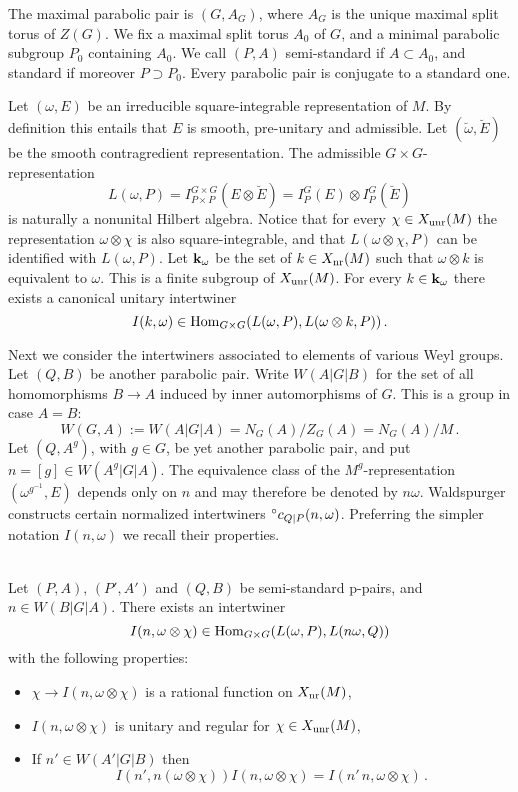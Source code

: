 The maximal parabolic pair is $(G,A_G )$, where $A_G$ is the unique
maximal split torus of $Z(G)$.
We fix a maximal split torus $A_0$ of $G$, and a minimal parabolic
subgroup $P_0$ containing $A_0$. We call $(P,A)$ semi-standard if
$A \subset A_0$, and standard if moreover $P \supset P_0$. Every
parabolic pair is conjugate to a standard one.

Let $(\omega ,E)$ be an irreducible square-integrable representation of $M$. 
By definition this entails that $E$ is smooth, pre-unitary and admissible. 
Let $(\breve \omega, \breve E)$ be the smooth contragredient representation. 
The admissible $G\times G$-representation
\[
L(\omega ,P) = I_{P \times P}^{G \times G} (E \otimes \breve E) =
I_P^G (E) \otimes I_P^G (\breve E )
\]
is naturally a nonunital Hilbert algebra. Notice that for every
$\chi \in X_{\mathrm{unr}} (M)$ the representation $\omega \otimes \chi$ is
also square-integrable, and that $L(\omega \otimes \chi ,P)$ can
be identified with $L(\omega ,P)$. Let $\mathbf k_\omega$ be the set of $k
\in X_{\mathrm{nr}} (M)$ such that $\omega \otimes k$ is equivalent to
$\omega$. This is a finite subgroup of $X_{\mathrm{unr}} (M)$. For every $k
\in \mathbf k_\omega$ there exists a canonical unitary intertwiner
\[
I(k,\omega ) \in \mathrm{Hom}_{G \times G} (L (\omega ,P),L(\omega \otimes k,P)) \,.
\]

Next we consider the intertwiners associated to elements of
various Weyl groups. Let  $(Q,B)$ be another parabolic pair. Write
$W(A|G|B)$ for the set of all homomorphisms $B \to A$ induced by
inner automorphisms of $G$. This is a group in case $A = B $:
\[
W(G,A) := W(A|G|A) = N_G (A) / Z_G (A) = N_G (A) / M \,.
\]
Let $(Q,A^g )$, with $g \in G$, be yet another parabolic pair, and
put $n = [g] \in W (A^g |G|A)$. The equivalence class of the
$M^g$-representation $(\omega^{g^{-1}},E)$ depends only on $n$ and
may therefore be denoted by $n \omega$. Waldspurger constructs
certain normalized intertwiners $\prefix{^\circ}{c_{Q|P}}(n,\omega
)$. Preferring the simpler notation $I(n,\omega)$ we recall their
properties.

\begin{thm}\label{thm:2.4} \textup{\cite[Paragraphe V]{Wal}} \\
Let $(P,A) ,\, (P',A')$ and $(Q,B)$ be semi-standard
p-pairs, and $n \in W (B|G|A)$. There exists an intertwiner
\[
I (n,\omega \otimes \chi) \in \mathrm{Hom}_{G \times G} (L (\omega ,P)
, L (n \omega ,Q) )
\]
with the following properties:
\begin{itemize}
\item $\chi \to I (n, \omega \otimes \chi)$ is a rational
function on $X_{\mathrm{nr}} (M) $,
\item $I (n ,\omega \otimes \chi)$ is unitary and regular
for $\chi \in X_{\mathrm{unr}} (M) $,
\item If $n' \in W (A' |G|B)$ then
\[
I (n',n (\omega \otimes \chi) ) I (n,\omega \otimes \chi) = 
I (n' \, n, \omega \otimes \chi) \,.
\]
\end{itemize}
\end{thm}

